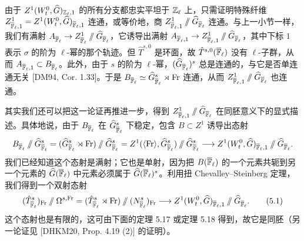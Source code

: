 由于 $Z^1(W_t^0,\widehat{G})_{\mathbb{Z}_\ell,1}$ 的所有分支都忠实平坦于 $\mathbb{Z}_\ell$ 上，只需证明特殊纤维 $Z^1_{\overline{\mathbb{F}}_\ell,1}=Z^1(W_t^0,\widehat{G})_{\overline{\mathbb{F}}_\ell,1}$ 连通，或等价地，商 $Z^1_{\overline{\mathbb{F}}_\ell,1}\sslash\widehat{G}_{\overline{\mathbb{F}}_\ell}$ 连通。与上一小节一样，我们有满射 $A_{\overline{\mathbb{F}}_\ell}\to Z^1_{\overline{\mathbb{F}}_\ell}\sslash\widehat{G}_{\overline{\mathbb{F}}_\ell}$，它诱导出满射 $A_{\overline{\mathbb{F}}_\ell,1}\to Z^1_{\overline{\mathbb{F}}_\ell,1}\sslash\widehat{G}_{\overline{\mathbb{F}}_\ell}$，其中下标 $1$ 表示 $\sigma$ 的阶为 $\ell$-幂的那个轨迹。但 $\hat T^{s,0}$ 是环面，故 $\hat T^{s,0}(\overline{\mathbb{F}}_\ell)$ 没有 $\ell$-子群，从而 $A_{\overline{\mathbb{F}}_\ell,1}\subset B_{\overline{\mathbb{F}}_\ell}$。此外，由于 $s$ 的阶为 $\ell$-幂，$(\widehat{G}_{\overline{\mathbb{F}}_\ell})^s$ 总是连通的，与它是否单连通无关 [DM94, Cor. 1.33]。于是 $B_{\overline{\mathbb{F}}_\ell}\simeq\widehat{G}^s_{\overline{\mathbb{F}}_\ell}\rtimes\mathrm{Fr}$ 连通，从而 $Z^1_{\overline{\mathbb{F}}_\ell,1}\sslash\widehat{G}_{\overline{\mathbb{F}}_\ell}$ 也连通。

其实我们还可以把这一论证再推进一步，得到 $Z^1_{\overline{\mathbb{F}}_\ell,1}\sslash\widehat{G}_{\overline{\mathbb{F}}_\ell}$ 在同胚意义下的显式描述。具体地说，由于 $B_{\overline{\mathbb{F}}_\ell}$ 在 $\widehat{G}^s_{\overline{\mathbb{F}}_\ell}$ 下稳定，包含 $B\subset Z^1$ 诱导出态射
\[
B_{\overline{\mathbb{F}}_\ell}\sslash\widehat{G}^s_{\overline{\mathbb{F}}_\ell}
=(\widehat{G}^s_{\overline{\mathbb{F}}_\ell}\rtimes\mathrm{Fr})\sslash\widehat{G}^s_{\overline{\mathbb{F}}_\ell}
=Z^1(\langle\mathrm{Fr}\rangle,\widehat{G}^s_{\overline{\mathbb{F}}_\ell})\sslash\widehat{G}^s_{\overline{\mathbb{F}}_\ell}
\longrightarrow Z^1(W_t^0,\widehat{G})_{\overline{\mathbb{F}}_\ell,1}\sslash\widehat{G}_{\overline{\mathbb{F}}_\ell}.
\]
我们已经知道这个态射是满射；它也是单射，因为把 $B(\overline{\mathbb{F}}_\ell)$ 的一个元素共轭到另一个元素的 $\widehat{G}(\overline{\mathbb{F}}_\ell)$ 中元素必须属于 $\widehat{G}(\overline{\mathbb{F}}_\ell)^s$。利用扭 Chevalley--Steinberg 定理，我们得到一个双射态射
\begin{equation}
(\hat T^s_{\overline{\mathbb{F}}_\ell})_{\mathrm{Fr}}\sslash\Omega^{s,\mathrm{Fr}}
=(\hat T^s_{\overline{\mathbb{F}}_\ell}\rtimes\mathrm{Fr})\sslash(N^s_{\overline{\mathbb{F}}_\ell})_{\mathrm{Fr}}
\longrightarrow Z^1(W_t^0,\widehat{G})_{\overline{\mathbb{F}}_\ell,1}\sslash\widehat{G}_{\overline{\mathbb{F}}_\ell}.
\tag{5.1}
\end{equation}
这个态射也是有限的，这可由下面的定理 5.17 或定理 5.18 得到，故它是同胚（另一论证见 [DHKM20, Prop. 4.19 (2)] 的证明）。

